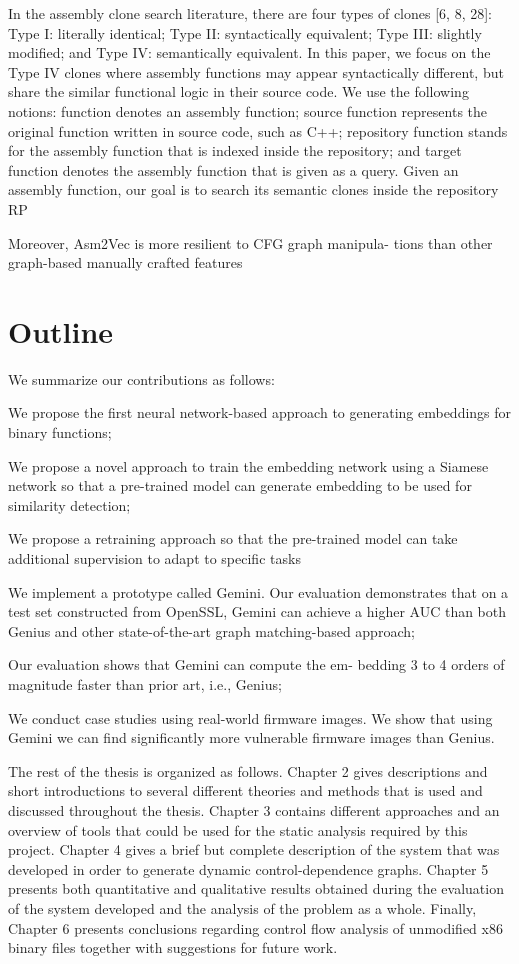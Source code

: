 In the assembly clone search literature, there are four types of
clones [6, 8, 28]: Type I: literally identical; Type II: syntactically
equivalent; Type III: slightly modified; and Type IV: semantically
equivalent. In this paper, we focus on the Type IV clones where
assembly functions may appear syntactically different, but share the
similar functional logic in their source code. We use the following
notions: function denotes an assembly function; source function
represents the original function written in source code, such as C++;
repository function stands for the assembly function that is indexed
inside the repository; and target function denotes the assembly
function that is given as a query. Given an assembly function, our
goal is to search its semantic clones inside the repository RP

Moreover, Asm2Vec is more resilient to CFG graph manipula-
tions than other graph-based manually crafted features

\section{Outline}
We summarize our contributions as follows:

We propose the first neural network-based approach to generating embeddings for binary functions;

We propose a novel approach to train the embedding network using a Siamese network so that a pre-trained model can generate embedding to be used for similarity detection;

We propose a retraining approach so that the pre-trained
model can take additional supervision to adapt to specific
tasks

We implement a prototype called Gemini. Our evaluation
demonstrates that on a test set constructed from OpenSSL,
Gemini can achieve a higher AUC than both Genius and
other state-of-the-art graph matching-based approach;

Our evaluation shows that Gemini can compute the em-
bedding 3 to 4 orders of magnitude faster than prior art,
i.e., Genius;

We conduct case studies using real-world firmware images.
We show that using Gemini we can find significantly more
vulnerable firmware images than Genius.


The rest of the thesis is organized as follows. Chapter 2 gives descriptions
and short introductions to several different theories and methods that is used
and discussed throughout the thesis. Chapter 3 contains different approaches
and an overview of tools that could be used for the static analysis required by
this project. Chapter 4 gives a brief but complete description of the system
that was developed in order to generate dynamic control-dependence graphs.
Chapter 5 presents both quantitative and qualitative results obtained during
the evaluation of the system developed and the analysis of the problem as a
whole. Finally, Chapter 6 presents conclusions regarding control flow analysis
of unmodified x86 binary files together with suggestions for future work.
